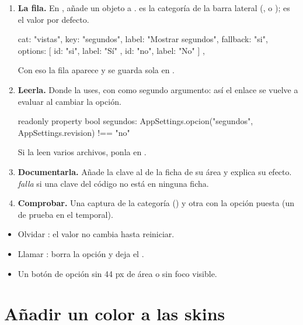 \begin{enumerate}
  \item \textbf{La fila.} En , añade un objeto a
  .  es la categoría de la barra lateral (,
   o );  es el valor por defecto.
\begin{qml}
{ cat: "vistas", key: "segundos", label: "Mostrar segundos", fallback: "si",
  options: [{ id: "si", label: "Sí" }, { id: "no", label: "No" }] },
\end{qml}
  Con eso la fila aparece y se guarda sola en .
  \item \textbf{Leerla.} Donde la uses, con  como segundo argumento:
  así el enlace se vuelve a evaluar al cambiar la opción.
\begin{qml}
readonly property bool segundos: AppSettings.opcion("segundos", AppSettings.revision) !== "no"
\end{qml}
  Si la leen varios archivos, ponla en .
  \item \textbf{Documentarla.} Añade la clave al  de la ficha de su área y
  explica su efecto.  \emph{falla} si una clave del código no está en
  ninguna ficha.
  \item \textbf{Comprobar.} Una captura de la categoría
  () y otra con la opción puesta (un
   de prueba en el  temporal).
\end{enumerate}

\begin{trampa}
\begin{itemize}
  \item Olvidar : el valor no cambia hasta reiniciar.
  \item Llamar : borra la opción y deja el .
  \item Un botón de opción sin 44 px de área o sin foco visible.
\end{itemize}
\end{trampa}

\section{Añadir un color a las skins}

